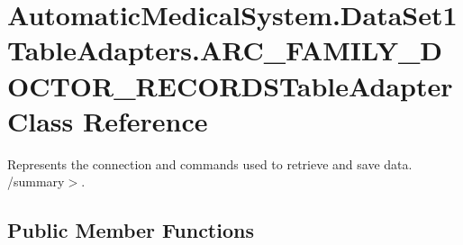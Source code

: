 \section{AutomaticMedicalSystem.DataSet1TableAdapters.ARC\_\-FAMILY\_\-DOCTOR\_\-RECORDSTableAdapter Class Reference}
\label{class_automatic_medical_system_1_1_data_set1_table_adapters_1_1_a_r_c___f_a_m_i_l_y___d_o_c_t_o_r___r_e_c_o_r_d_s_table_adapter}
Represents the connection and commands used to retrieve and save data. /summary$>$.  


\subsection*{Public Member Functions}
